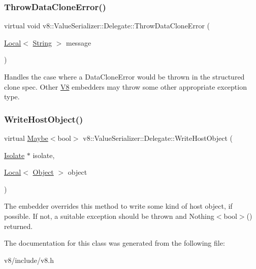 \subsubsection{\texorpdfstring{Throw\+Data\+Clone\+Error()}{ThrowDataCloneError()}}
{\footnotesize\ttfamily virtual void v8\+::\+Value\+Serializer\+::\+Delegate\+::\+Throw\+Data\+Clone\+Error (\begin{DoxyParamCaption}\item[{\mbox{\hyperlink{classv8_1_1Local}{Local}}$<$ \mbox{\hyperlink{classv8_1_1String}{String}} $>$}]{message }\end{DoxyParamCaption})\hspace{0.3cm}{\ttfamily [pure virtual]}}

Handles the case where a Data\+Clone\+Error would be thrown in the structured clone spec. Other \mbox{\hyperlink{classv8_1_1V8}{V8}} embedders may throw some other appropriate exception type. \mbox{\label{classv8_1_1ValueSerializer_1_1Delegate_ae97808060b22d7a94517f725922b72c6}} 
\subsubsection{\texorpdfstring{Write\+Host\+Object()}{WriteHostObject()}}
{\footnotesize\ttfamily virtual \mbox{\hyperlink{classv8_1_1Maybe}{Maybe}}$<$bool$>$ v8\+::\+Value\+Serializer\+::\+Delegate\+::\+Write\+Host\+Object (\begin{DoxyParamCaption}\item[{\mbox{\hyperlink{classv8_1_1Isolate}{Isolate}} $\ast$}]{isolate,  }\item[{\mbox{\hyperlink{classv8_1_1Local}{Local}}$<$ \mbox{\hyperlink{classv8_1_1Object}{Object}} $>$}]{object }\end{DoxyParamCaption})\hspace{0.3cm}{\ttfamily [virtual]}}

The embedder overrides this method to write some kind of host object, if possible. If not, a suitable exception should be thrown and Nothing$<$bool$>$() returned. 

The documentation for this class was generated from the following file\+:\begin{DoxyCompactItemize}
\item 
v8/include/v8.\+h\end{DoxyCompactItemize}
